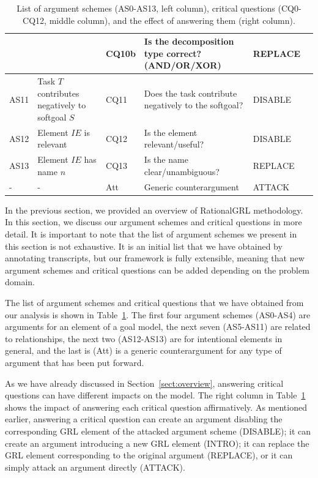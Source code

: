 \begin{table}[h]
\begin{tabularx}{\textwidth}{|l|l|l|X|l|l|}
 &  & CQ10b & Is the decomposition type correct? (AND/OR/XOR)& REPLACE\\
\hline
AS11 & Task $T$ contributes negatively to softgoal $S$& CQ11 & Does the task contribute negatively to the softgoal?& DISABLE\\
\hline
\hline
AS12 & Element $IE$ is relevant & CQ12 & Is the element relevant/useful? & DISABLE\\
\hline
AS13 & Element $IE$ has name $n$ & CQ13 & Is the name clear/unambiguous? & REPLACE\\
\hline
\hline
- & - & Att & Generic counterargument & ATTACK\\
\hline
\end{tabularx}
\caption{List of argument schemes (AS0-AS13, left column), critical questions (CQ0-CQ12, middle column), and the effect of answering them (right column).}
\label{table:argument-schemes}
\end{table}

In the previous section, we provided an overview of RationalGRL methodology. In this section, we discuss our argument schemes and critical questions in more detail. It is important to note that the list of argument schemes we present in this section is not exhaustive. It is an initial list that we have obtained by annotating transcripts, but our framework is fully extensible, meaning that new argument schemes and critical questions can be added depending on the problem domain.

The list of argument schemes and critical questions that we have obtained from our analysis is shown in Table~\ref{table:argument-schemes}. The first four argument schemes (AS0-AS4) are arguments for an element of a goal model, the next seven (AS5-AS11) are related to relationships, the next two (AS12-AS13) are for intentional elements in general, and the last is (Att) is a generic counterargument for any type of argument that has been put forward.

As we have already discussed in Section~\ref{sect:overview}, answering critical questions can have different impacts on the model. The right column in Table~\ref{table:argument-schemes} shows the impact of answering each critical question affirmatively. %
As mentioned earlier, answering a critical question can create an argument disabling the corresponding GRL element of the attacked argument scheme (\textsf{DISABLE}); it can create an argument introducing a new GRL element (\textsf{INTRO}); it can replace the GRL element corresponding to the original argument (\textsf{REPLACE}), or it can simply attack an argument directly (\textsf{ATTACK}).

